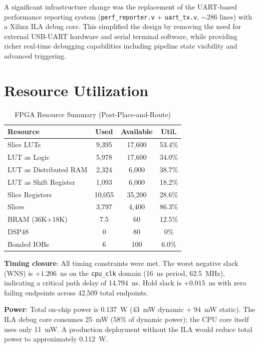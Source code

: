 \documentclass[conference]{IEEEtran}
\begin{document}
A significant infrastructure change was the replacement of the UART-based performance reporting system (\texttt{perf\_reporter.v} + \texttt{uart\_tx.v}, $\sim$286 lines) with a Xilinx ILA debug core. This simplified the design by removing the need for external USB-UART hardware and serial terminal software, while providing richer real-time debugging capabilities including pipeline state visibility and advanced triggering.

\section{Resource Utilization}

\begin{table}[htbp]
\caption{FPGA Resource Summary (Post-Place-and-Route)}
\begin{center}
\begin{tabular}{|l|c|c|c|}
\hline
\textbf{Resource} & \textbf{Used} & \textbf{Available} & \textbf{Util.} \\
\hline
Slice LUTs & 9,395 & 17,600 & 53.4\% \\
\quad LUT as Logic & 5,978 & 17,600 & 34.0\% \\
\quad LUT as Distributed RAM & 2,324 & 6,000 & 38.7\% \\
\quad LUT as Shift Register & 1,093 & 6,000 & 18.2\% \\
Slice Registers & 10,055 & 35,200 & 28.6\% \\
Slices & 3,797 & 4,400 & 86.3\% \\
BRAM (36K+18K) & 7.5 & 60 & 12.5\% \\
DSP48 & 0 & 80 & 0\% \\
Bonded IOBs & 6 & 100 & 6.0\% \\
\hline
\end{tabular}
\label{tab:resources}
\end{center}
\end{table}

\textbf{Timing closure}: All timing constraints were met. The worst negative slack (WNS) is $+1.206$~ns on the \texttt{cpu\_clk} domain (16~ns period, 62.5~MHz), indicating a critical path delay of 14.794~ns. Hold slack is $+0.015$~ns with zero failing endpoints across 42,509 total endpoints.

\textbf{Power}: Total on-chip power is 0.137~W (43~mW dynamic + 94~mW static). The ILA debug core consumes 25~mW (58\% of dynamic power); the CPU core itself uses only 11~mW. A production deployment without the ILA would reduce total power to approximately 0.112~W.
\end{document}
